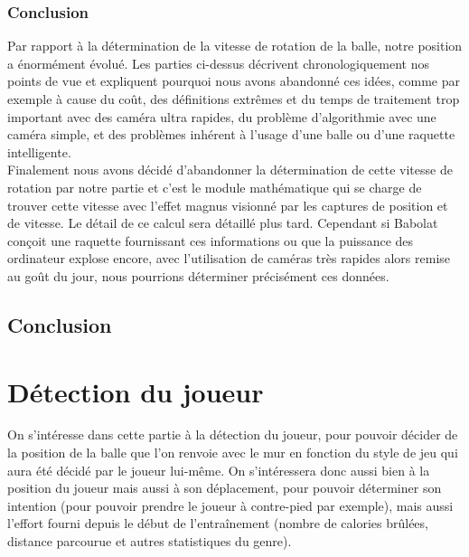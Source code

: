 \subsection{Conclusion}

Par rapport à la détermination de la vitesse de rotation de la balle, notre position a énormément évolué. Les parties ci-dessus décrivent chronologiquement nos points de vue et expliquent pourquoi nous avons abandonné ces idées, comme par exemple à cause du coût, des définitions extrêmes et du temps de traitement trop important avec des caméra ultra rapides, du problème d'algorithmie avec une caméra simple, et des problèmes inhérent à l'usage d'une balle ou d'une raquette intelligente.\\
Finalement nous avons décidé d'abandonner la détermination de cette vitesse de rotation par notre partie et c'est le module mathématique qui se charge de trouver cette vitesse avec l'effet magnus visionné par les captures de position et de vitesse. Le détail de ce calcul sera détaillé plus tard. Cependant si Babolat conçoit une raquette fournissant ces informations ou que la puissance des ordinateur explose encore, avec l'utilisation de caméras très rapides alors remise au goût du jour, nous pourrions déterminer précisément ces données.








\section{Conclusion}






















\chapter{Détection du joueur}

On s'intéresse dans cette partie à la détection du joueur, pour pouvoir décider de la position de la balle que l'on renvoie avec le mur en fonction du style de jeu qui aura été décidé par le joueur lui-même. On s'intéressera donc aussi bien à la position du joueur mais aussi à son déplacement, pour pouvoir déterminer son intention (pour pouvoir prendre le joueur à contre-pied par exemple), mais aussi l'effort fourni depuis le début de l'entraînement (nombre de calories brûlées, distance parcourue et autres statistiques du genre). \\

